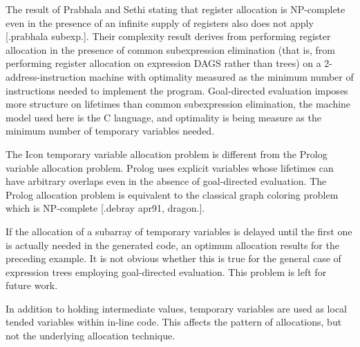 The result of Prabhala and Sethi stating that register allocation is
NP-complete even in the presence of an infinite supply of registers
also does not apply [.prabhala subexp.]. Their complexity result
derives from performing register allocation in the presence of common
subexpression elimination (that is, from performing register
allocation on expression DAGS rather than trees) on a
2-address-instruction machine with optimality measured as the minimum
number of instructions needed to implement the program. Goal-directed
evaluation imposes more structure on lifetimes than common
subexpression elimination, the machine model used here is the C
language, and optimality is being measure as the minimum number of
temporary variables needed.

The Icon temporary variable allocation problem is different from the
Prolog variable allocation problem. Prolog uses explicit variables
whose lifetimes can have arbitrary overlaps even in the absence of
goal-directed evaluation. The Prolog allocation problem is equivalent
to the classical graph coloring problem which is NP-complete [.debray
apr91, dragon.].

If the allocation of a subarray of temporary variables is delayed
until the first one is actually needed in the generated code, an
optimum allocation results for the preceding example. It is not
obvious whether this is true for the general case of expression trees
employing goal-directed evaluation. This problem is left for future
work.

In addition to holding intermediate values, temporary variables are
used as local tended variables within in-line code.  This affects the
pattern of allocations, but not the underlying allocation technique.
